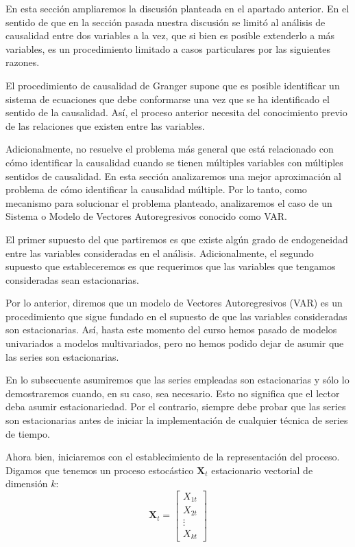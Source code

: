 \documentclass[
]{book}
\begin{document}
En esta sección ampliaremos la discusión planteada en el apartado
anterior. En el sentido de que en la sección pasada nuestra discusión se
limitó al análisis de causalidad entre dos variables a la vez, que si
bien es posible extenderlo a más variables, es un procedimiento limitado
a casos particulares por las siguientes razones.

El procedimiento de causalidad de Granger supone que es posible
identificar un sistema de ecuaciones que debe conformarse una vez que se
ha identificado el sentido de la causalidad. Así, el proceso anterior
necesita del conocimiento previo de las relaciones que existen entre las
variables.

Adicionalmente, no resuelve el problema más general que está relacionado
con cómo identificar la causalidad cuando se tienen múltiples variables
con múltiples sentidos de causalidad. En esta sección analizaremos una
mejor aproximación al problema de cómo identificar la causalidad
múltiple. Por lo tanto, como mecanismo para solucionar el problema
planteado, analizaremos el caso de un Sistema o Modelo de Vectores
Autoregresivos conocido como VAR.

El primer supuesto del que partiremos es que existe algún grado de
endogeneidad entre las variables consideradas en el análisis.
Adicionalmente, el segundo supuesto que estableceremos es que requerimos
que las variables que tengamos consideradas sean estacionarias.

Por lo anterior, diremos que un modelo de Vectores Autoregresivos (VAR)
es un procedimiento que sigue fundado en el supuesto de que las
variables consideradas son estacionarias. Así, hasta este momento del
curso hemos pasado de modelos univariados a modelos multivariados, pero
no hemos podido dejar de asumir que las series son estacionarias.

En lo subsecuente asumiremos que las series empleadas son estacionarias
y sólo lo demostraremos cuando, en su caso, sea necesario. Esto no
significa que el lector deba asumir estacionariedad. Por el contrario,
siempre debe probar que las series son estacionarias antes de iniciar la
implementación de cualquier técnica de series de tiempo.

Ahora bien, iniciaremos con el establecimiento de la representación del
proceso. Digamos que tenemos un proceso estocástico \(\mathbf{X}_t\)
estacionario vectorial de dimensión \(k\): \begin{equation*}
    \mathbf{X}_t = 
    \begin{bmatrix}
    X_{1t} \\ X_{2t} \\ \vdots \\ X_{kt}
    \end{bmatrix}
\end{equation*}
\end{document}
